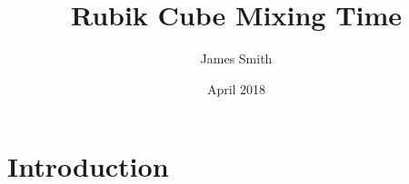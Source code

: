 \documentclass{article}
\title{Rubik Cube Mixing Time}
\author{James Smith}
\date{April 2018}
\begin{document}
\maketitle

\section{Introduction}
\end{document}
